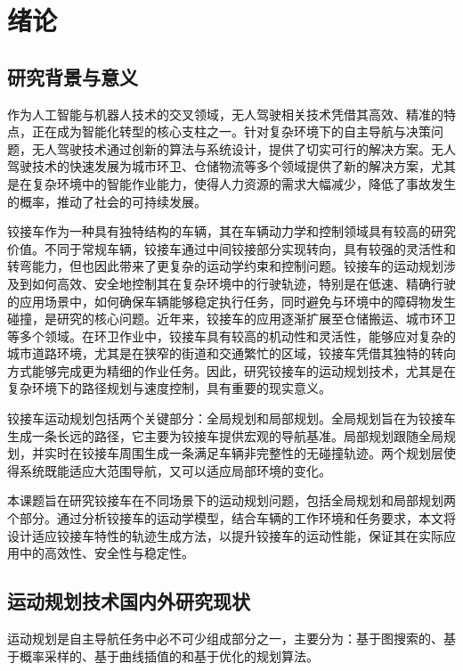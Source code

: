 \documentclass[master,academic]{ysuthesis} %
\begin{document}

	\customizedtableofcontents

	\chapter{绪论}
	\section{研究背景与意义}
	作为人工智能与机器人技术的交叉领域，无人驾驶相关技术凭借其高效、精准的特点，正在成为智能化转型的核心支柱之一。针对复杂环境下的自主导航与决策问题，无人驾驶技术通过创新的算法与系统设计，提供了切实可行的解决方案。无人驾驶技术的快速发展为城市环卫、仓储物流等多个领域提供了新的解决方案，尤其是在复杂环境中的智能作业能力，使得人力资源的需求大幅减少，降低了事故发生的概率，推动了社会的可持续发展。

	铰接车作为一种具有独特结构的车辆，其在车辆动力学和控制领域具有较高的研究价值。不同于常规车辆，铰接车通过中间铰接部分实现转向，具有较强的灵活性和转弯能力，但也因此带来了更复杂的运动学约束和控制问题。铰接车的运动规划涉及到如何高效、安全地控制其在复杂环境中的行驶轨迹，特别是在低速、精确行驶的应用场景中，如何确保车辆能够稳定执行任务，同时避免与环境中的障碍物发生碰撞，是研究的核心问题。近年来，铰接车的应用逐渐扩展至仓储搬运、城市环卫等多个领域。在环卫作业中，铰接车具有较高的机动性和灵活性，能够应对复杂的城市道路环境，尤其是在狭窄的街道和交通繁忙的区域，铰接车凭借其独特的转向方式能够完成更为精细的作业任务。因此，研究铰接车的运动规划技术，尤其是在复杂环境下的路径规划与速度控制，具有重要的现实意义。
	
	铰接车运动规划包括两个关键部分：全局规划和局部规划。全局规划旨在为铰接车生成一条长远的路径，它主要为铰接车提供宏观的导航基准。局部规划跟随全局规划，并实时在铰接车周围生成一条满足车辆非完整性的无碰撞轨迹。两个规划层使得系统既能适应大范围导航，又可以适应局部环境的变化。

	本课题旨在研究铰接车在不同场景下的运动规划问题，包括全局规划和局部规划两个部分。通过分析铰接车的运动学模型，结合车辆的工作环境和任务要求，本文将设计适应铰接车特性的轨迹生成方法，以提升铰接车的运动性能，保证其在实际应用中的高效性、安全性与稳定性。
	\section{运动规划技术国内外研究现状}
	运动规划是自主导航任务中必不可少组成部分之一，主要分为：基于图搜索的、基于概率采样的、基于曲线插值的和基于优化的规划算法。
\end{document}
